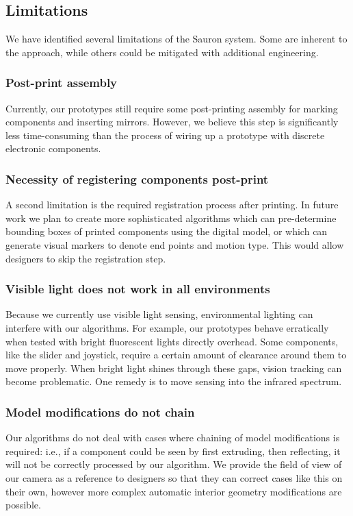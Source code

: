     \subsection{Limitations}
    
    We have identified several limitations of the Sauron system. Some are inherent to the approach, while others could be mitigated with additional engineering.
    
    \subsubsection{Post-print assembly}
    
    Currently, our prototypes still require some post-printing assembly for marking components and inserting mirrors. However, we believe this step is significantly less time-consuming than the process of wiring up a prototype with discrete electronic components. 

    \subsubsection{Necessity of registering components post-print}
    A second limitation is the required registration process after printing. In future work we plan to create more sophisticated algorithms which can pre-determine bounding boxes of printed components using the digital model, or which can generate visual markers to denote end points and motion type. This would allow designers to skip the registration step.
    
    \subsubsection{Visible light does not work in all environments}
    Because we currently use visible light sensing, environmental lighting can interfere with our algorithms. For example, our prototypes behave erratically when tested with bright fluorescent lights directly overhead. Some components, like the slider and joystick, require a certain amount of clearance around them to move properly. When bright light shines through these gaps, vision tracking can become problematic. One remedy is to move sensing into the infrared spectrum.%
    
    \subsubsection{Model modifications do not chain}
    Our algorithms do not deal with cases where chaining of model modifications is required: i.e., if a component could be seen by first extruding, then reflecting, it will not be correctly processed by our algorithm. We provide the field of view of our camera as a reference to designers so that they can correct cases like this on their own, however more complex automatic interior geometry modifications are possible. 
    
